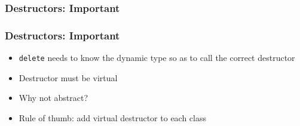 \documentclass{../ucll-slides}
\begin{document}
\begin{frame}
  \frametitle{Destructors: Important}
\end{frame}

\begin{frame}
  \frametitle{Destructors: Important}
  \begin{itemize}
    \item {\tt delete} needs to know the dynamic type so as to
          call the correct destructor
    \item Destructor must be virtual
          \vskip2mm
    \item Why not abstract? \cake
          \vskip2mm
    \item Rule of thumb: add virtual destructor to each class
  \end{itemize}
\end{frame}
\end{document}
